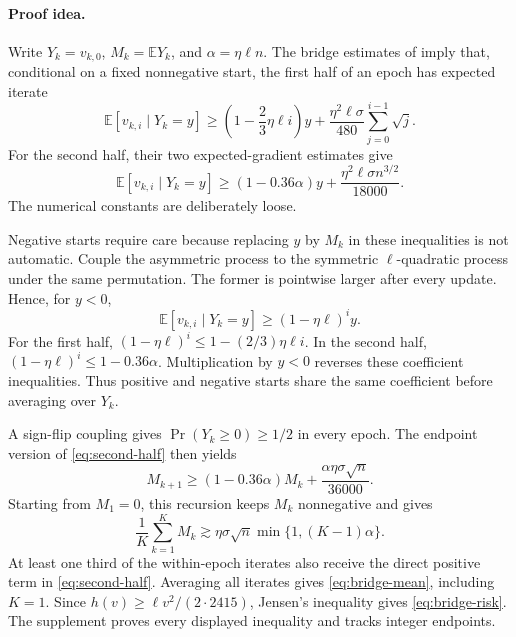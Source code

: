 \documentclass[twoside]{article}
\newcommand{\E}{\mathbb E}
\newcommand{\asympdown}{\mathrel{\gtrsim}}
\begin{document}
\paragraph{Proof idea.}
Write $Y_k=v_{k,0}$, $M_k=\E Y_k$, and $\alpha=\eta\ell n$. The bridge estimates of \citet{cha2023tighter} imply that, conditional on a fixed nonnegative start, the first half of an epoch has expected iterate
\begin{equation}
 \E[v_{k,i}\mid Y_k=y]
 \ge \left(1-\frac23\eta\ell i\right)y
 +\frac{\eta^2\ell\sigma}{480}
 \sum_{j=0}^{i-1}\sqrt j.
 \label{eq:first-half}
\end{equation}
For the second half, their two expected-gradient estimates give
\begin{equation}
 \E[v_{k,i}\mid Y_k=y]
 \ge(1-0.36\alpha)y
 +\frac{\eta^2\ell\sigma n^{3/2}}{18000}.
 \label{eq:second-half}
\end{equation}
The numerical constants are deliberately loose.

Negative starts require care because replacing $y$ by $M_k$ in these inequalities is not automatic. Couple the asymmetric process to the symmetric $\ell$-quadratic process under the same permutation. The former is pointwise larger after every update. Hence, for $y<0$,
\begin{equation}
 \E[v_{k,i}\mid Y_k=y]\ge(1-\eta\ell)^iy.
 \label{eq:negative}
\end{equation}
For the first half, $(1-\eta\ell)^i\le1-(2/3)\eta\ell i$. In the second half, $(1-\eta\ell)^i\le1-0.36\alpha$. Multiplication by $y<0$ reverses these coefficient inequalities. Thus positive and negative starts share the same coefficient before averaging over $Y_k$.

A sign-flip coupling gives $\Pr(Y_k\ge0)\ge1/2$ in every epoch. The endpoint version of \eqref{eq:second-half} then yields
\begin{equation}
 M_{k+1}\ge(1-0.36\alpha)M_k
 +\frac{\alpha\eta\sigma\sqrt n}{36000}.
 \label{eq:epoch-recursion}
\end{equation}
Starting from $M_1=0$, this recursion keeps $M_k$ nonnegative and gives
\begin{equation}
 \frac1K\sum_{k=1}^KM_k
 \asympdown \eta\sigma\sqrt n\min\{1,(K-1)\alpha\}.
 \label{eq:mean-starts}
\end{equation}
At least one third of the within-epoch iterates also receive the direct positive term in \eqref{eq:second-half}. Averaging all iterates gives \eqref{eq:bridge-mean}, including $K=1$. Since $h(v)\ge\ell v^2/(2\cdot2415)$, Jensen's inequality gives \eqref{eq:bridge-risk}. The supplement proves every displayed inequality and tracks integer endpoints.
\end{document}
